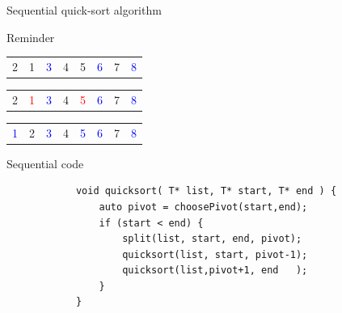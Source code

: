 \documentclass[compress,10pt,aspectratio=169]{beamer}
\begin{document}
\begin{frame}[fragile]{Sequential quick-sort algorithm}
\begin{block}{\small Reminder}
\begin{itemize}
{            }
             { 
            \begin{center}
                \begin{tabular}{cccccccc}
                    2 & 1 & \textcolor{blue}{3} & 4 & 5 & \textcolor{blue}{6} & 7 & \textcolor{blue}{8} \\
                \end{tabular}
            \end{center}
            }
             { 
            \begin{center}
                \begin{tabular}{cccccccc}
                    2 & \textcolor{red}{1} & \textcolor{blue}{3} & 4 & \textcolor{red}{5} & \textcolor{blue}{6} & 7 & \textcolor{blue}{8} \\
                \end{tabular}
            \end{center}
            }
             { 
            \begin{center}
                \begin{tabular}{cccccccc}
                    \textcolor{blue}{1} & 2 & \textcolor{blue}{3} & 4 & \textcolor{blue}{5} & \textcolor{blue}{6} & 7 & \textcolor{blue}{8} \\
                \end{tabular}
            \end{center}
            }
        \end{itemize}
    \end{block}

    \begin{exampleblock}{\small Sequential code}
        \begin{verbatim}
            void quicksort( T* list, T* start, T* end ) {
                auto pivot = choosePivot(start,end);
                if (start < end) {
                    split(list, start, end, pivot);
                    quicksort(list, start, pivot-1);
                    quicksort(list,pivot+1, end   );
                }
            }
        \end{verbatim}
    \end{exampleblock}
\end{frame}
\end{document}

